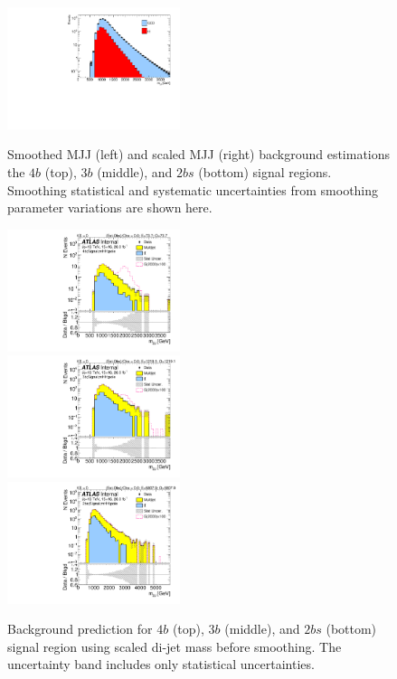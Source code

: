 \begin{figure}[htbp!]
\begin{center}
\includegraphics[angle=270, width=0.45\textwidth]{figures/boosted/Smooth/TwoTag_split_pole_smoothed.pdf}\\
\caption{Smoothed MJJ (left) and scaled MJJ (right) background estimations the $4b$ (top), $3b$ (middle), and $2bs$ (bottom) signal regions. Smoothing statistical and systematic uncertainties from smoothing parameter variations are shown here. }
\label{fig:fig:signal-region-mjjscaled-smooth-bkg}
\end{center}
\end{figure}

\begin{figure}[htbp!]
\begin{center}
\includegraphics[angle=270, width=0.45\textwidth]{./figures/boosted/Signal/b77_FourTag_Signal_mHH_pole_1_blind.pdf}\\
\includegraphics[angle=270, width=0.45\textwidth]{./figures/boosted/Signal/b77_ThreeTag_Signal_mHH_pole_1_blind.pdf}\\
\includegraphics[angle=270, width=0.45\textwidth]{./figures/boosted/Signal/b77_TwoTag_split_Signal_mHH_pole_1_blind.pdf}
\end{center}
\caption{Background prediction for $4b$ (top), $3b$ (middle), and $2bs$ (bottom) signal region using scaled di-jet mass before smoothing. The uncertainty band includes only statistical uncertainties.}
\label{fig:signal-region-mjjscaled-nonsmooth-bkg-noSYS}
\end{figure}


